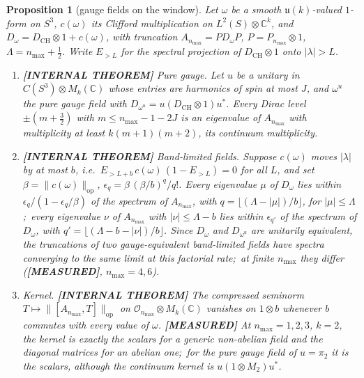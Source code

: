 \documentclass[11pt,a4paper]{article}
\theoremstyle{plain}
\newtheorem{proposition}[theorem]{Proposition}
\theoremstyle{definition}
\newcommand{\nmax}{n_{\max}}
\newcommand{\sthree}{S^{3}}
\newcommand{\Op}{\mathcal{O}}
\newcommand{\opnorm}[1]{\lVert #1 \rVert_{\mathrm{op}}}
\newcommand{\C}{\mathbb{C}}
\newcommand{\DCH}{D_{\mathrm{CH}}}
\begin{document}
\begin{proposition}[gauge fields on the window]
\label{prop:gauge_window}
Let $\omega$ be a smooth $\mathfrak{u}(k)$-valued $1$-form on $\sthree$,
$c(\omega)$ its Clifford multiplication on $L^2(S) \otimes \C^k$, and
$D_\omega = \DCH \otimes 1 + c(\omega)$, with truncation
$A_{\nmax} = P D_\omega P$, $P = P_{\nmax} \otimes 1$, $\Lambda =
\nmax + \tfrac12$. Write $E_{>L}$ for the spectral projection of
$\DCH \otimes 1$ onto $|\lambda| > L$.
\begin{enumerate}\setlength{\itemsep}{1pt}
\item[(a)] \textbf{[INTERNAL THEOREM]} \emph{Pure gauge.} Let $u$ be a
unitary in $C(\sthree) \otimes M_k(\C)$ whose entries are harmonics of
spin at most $J$, and $\omega^u$ the pure gauge field with
$D_{\omega^u} = u (\DCH \otimes 1) u^*$. Every Dirac level
$\pm(m + \tfrac32)$ with $m \le \nmax - 1 - 2J$ is an eigenvalue of
$A_{\nmax}$ with multiplicity at least $k(m+1)(m+2)$, its continuum
multiplicity.
\item[(b)] \textbf{[INTERNAL THEOREM]} \emph{Band-limited fields.}
Suppose $c(\omega)$ moves $|\lambda|$ by at most $b$, i.e.\
$E_{>L+b}\, c(\omega)\, (1 - E_{>L}) = 0$ for all $L$, and set $\beta =
\opnorm{c(\omega)}$, $\epsilon_q = \beta\,(\beta/b)^q/q!$. Every
eigenvalue $\mu$ of $D_\omega$ lies within $\epsilon_q /
(1 - \epsilon_q/\beta)$ of the spectrum of $A_{\nmax}$, with $q =
\lfloor (\Lambda - |\mu|)/b \rfloor$, for $|\mu| \le \Lambda$;\ every
eigenvalue $\nu$ of $A_{\nmax}$ with $|\nu| \le \Lambda - b$ lies within
$\epsilon_{q'}$ of the spectrum of $D_\omega$, with $q' = \lfloor
(\Lambda - b - |\nu|)/b \rfloor$. Since $D_\omega$
and $D_{\omega^u}$ are unitarily equivalent, the truncations of two
gauge-equivalent band-limited fields have spectra converging to the
same limit at this factorial rate;\ at finite $\nmax$ they differ
(\textbf{[MEASURED]}, $\nmax = 4, 6$).
\item[(c)] \emph{Kernel.} \textbf{[INTERNAL THEOREM]} The compressed
seminorm $T \mapsto \opnorm{[A_{\nmax}, T]}$ on $\Op_{\nmax} \otimes
M_k(\C)$ vanishes on $1 \otimes b$ whenever $b$ commutes with every
value of $\omega$. \textbf{[MEASURED]} At $\nmax = 1, 2, 3$, $k = 2$,
the kernel is exactly the scalars for a generic non-abelian field and
the diagonal matrices for an abelian one;\ for the pure gauge field of
$u = \pi_2$ it is the scalars, although the continuum kernel is
$u (1 \otimes M_2) u^*$.
\end{enumerate}
\end{proposition}
\end{document}

